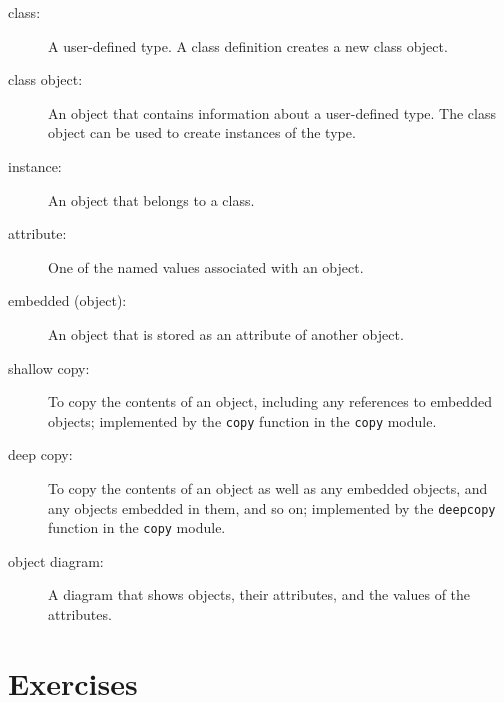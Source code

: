\documentclass[12pt,a4paper,final,twoside,onecolumn,titlepage]{book}
\begin{document}
\begin{description}

\item[class:] A user-defined type.  A class definition creates a new
class object.

\item[class object:] An object that contains information about a
user-defined type.  The class object can be used to create instances
of the type.

\item[instance:] An object that belongs to a class.

\item[attribute:] One of the named values associated with an object.

\item[embedded (object):] An object that is stored as an attribute
of another object.

\item[shallow copy:] To copy the contents of an object, including
any references to embedded objects;
implemented by the {\tt copy} function in the {\tt copy} module.

\item[deep copy:] To copy the contents of an object as well as any
embedded objects, and any objects embedded in them, and so on;
implemented by the {\tt deepcopy} function in the {\tt copy} module.

\item[object diagram:] A diagram that shows objects, their
attributes, and the values of the attributes.

\end{description}


\section{Exercises}
\end{document}

